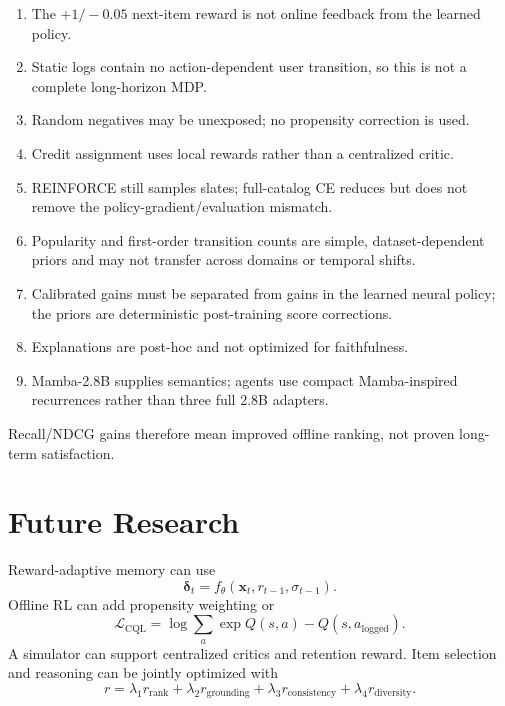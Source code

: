 \documentclass[11pt,a4paper]{article}
\begin{document}
\begin{enumerate}
  \item The $+1/-0.05$ next-item reward is not online feedback from the learned policy.
  \item Static logs contain no action-dependent user transition, so this is not a complete long-horizon MDP.
  \item Random negatives may be unexposed; no propensity correction is used.
  \item Credit assignment uses local rewards rather than a centralized critic.
  \item REINFORCE still samples slates; full-catalog CE reduces but does not remove the policy-gradient/evaluation mismatch.
  \item Popularity and first-order transition counts are simple, dataset-dependent priors and may not transfer across domains or temporal shifts.
  \item Calibrated gains must be separated from gains in the learned neural policy; the priors are deterministic post-training score corrections.
  \item Explanations are post-hoc and not optimized for faithfulness.
  \item Mamba-2.8B supplies semantics; agents use compact Mamba-inspired recurrences rather than three full 2.8B adapters.
\end{enumerate}

Recall/NDCG gains therefore mean improved offline ranking, not proven long-term satisfaction.

\section{Future Research}

Reward-adaptive memory can use
\begin{equation}
  \bm\delta_t=f_\theta(\bm x_t,r_{t-1},\sigma_{t-1}).
\end{equation}
Offline RL can add propensity weighting or
\begin{equation}
  \mathcal L_{\mathrm{CQL}}
  =
  \log\sum_a\exp Q(s,a)-Q(s,a_{\mathrm{logged}}).
\end{equation}
A simulator can support centralized critics and retention reward. Item selection and reasoning can be jointly optimized with
\begin{equation}
  r=
  \lambda_1r_{\mathrm{rank}}
  +\lambda_2r_{\mathrm{grounding}}
  +\lambda_3r_{\mathrm{consistency}}
  +\lambda_4r_{\mathrm{diversity}}.
\end{equation}
\end{document}
